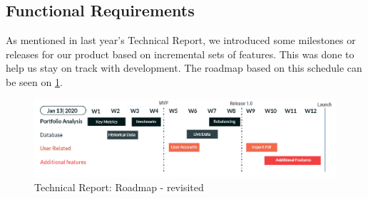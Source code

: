\documentclass[main.tex]{subfiles}
\begin{document}
\subsection{Functional Requirements}

As mentioned in last year's Technical Report, we introduced some milestones or releases for our product based on incremental sets of features. This was done to help us stay on track with development. The roadmap based on this schedule can be seen on \figurename{\ref{Roadmap}}.

\begin{figure}[H]
   \centering
   \includegraphics[width=\textwidth]{05Coding/05Pictures/initial_roadmap.jpg}
   \caption{Technical Report: Roadmap - revisited}
   \label{Roadmap}
\end{figure}
\end{document}
